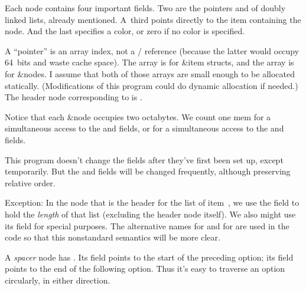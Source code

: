 Each node contains four important fields. Two are the pointers 
and  of doubly linked lists, already mentioned.
A~third points directly to the item containing the node.
And the last specifies a color, or zero if no color is specified.

A ``pointer'' is an array index, not a \CEE/ reference (because the latter
would occupy 64~bits and waste cache space). The  array is for
\&{item} structs, and the  array is for \&{node}s. I assume that
both of
those arrays are small enough to be allocated statically. (Modifications
of this program could do dynamic allocation if needed.)
The header node corresponding to  is .

Notice that each \&{node} occupies two octabytes.
We count one mem for a simultaneous access to the  and 
fields,
or for a simultaneous access to the  and  fields.

This program doesn't change the  fields after they've first been
set up,
except temporarily.
But the  and  fields will be changed frequently,
although preserving
relative order.

Exception: In the node  that is the header for the list of
item~, we use the  field to hold the {\it length\/} of that
list (excluding the header node itself).
We also might use its  field for special purposes.
The alternative names  for  and  for 
are used in the code so that this nonstandard semantics will be more clear.

A {\it spacer\/} node has . Its  field points
to the start
of the preceding option; its  field points to the end of the
following option.
Thus it's easy to traverse an option circularly, in either direction.

